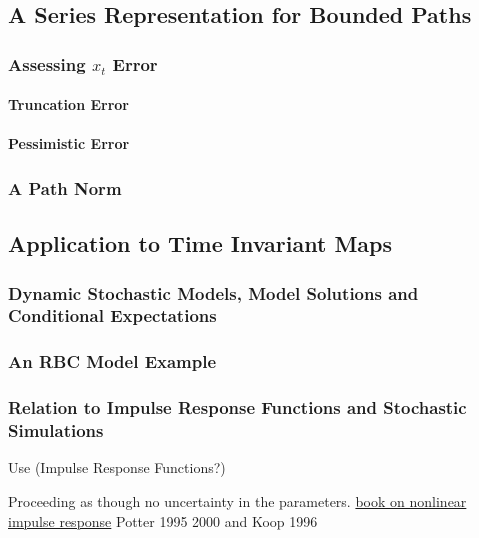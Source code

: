 \documentclass[12pt]{article}
\begin{document}
\subsection{A Series Representation for Bounded Paths}
\label{sec:boundedpaths}



\subsubsection{Assessing $x_t$ Error}
\label{sec:truncationerr}
\paragraph{Truncation Error}
\paragraph{Pessimistic Error}

\subsubsection{A Path Norm}
\label{sec:pathnorm}

\subsection{Application to Time Invariant Maps}
\label{sec:extToMaps}


\subsubsection{Dynamic Stochastic Models, Model Solutions  and Conditional Expectations}
\label{sec:condExp}

\subsubsection{An RBC Model Example}
\label{sec:rbcexample}


\subsubsection{Relation to Impulse Response Functions and Stochastic Simulations}
\label{sec:relImp}


Use (Impulse Response Functions?)

Proceeding as though no uncertainty in the parameters.
\href{https://books.google.co.uk/books?id=kLiRDgAAQBAJ&pg=PA77&lpg=PA77&dq=nonlinear+models+impulse+response+function+conditional+expectations&source=bl&ots=1pCjlcgxSu&sig=WA9INrvXVcFhVOd_2wq8-V6alw8&hl=en&sa=X&ved=0ahUKEwid1Y3fvuPWAhUlKsAKHT7lCDkQ6AEITjAF#v=onepage&q=nonlinear%20models%20impulse%20response%20function%20conditional%20expectations&f=false}{book on nonlinear impulse response}
  Potter 1995 2000 and Koop 1996
\end{document}
